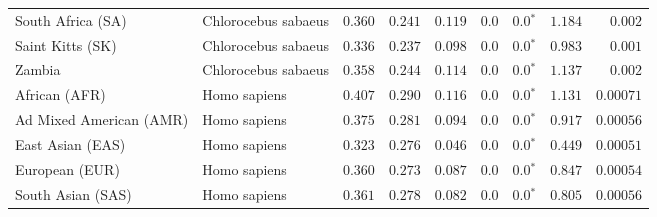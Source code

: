 \begin{center}
\begin{adjustbox}{width = 1\textwidth}
\begin{tabular}{|l|l|r|r|r|r|r|r|r|}
              South Africa (SA) &  Chlorocebus sabaeus &                                        $ 0.360$ &                                           $ 0.241$ &                      $ 0.119$ &            $0.0$ &                  $\bm{0.0{^*}}$ &                                           $ 1.184$ &           $ 0.002$ \\
               Saint Kitts (SK) &  Chlorocebus sabaeus &                                        $ 0.336$ &                                           $ 0.237$ &                      $ 0.098$ &            $0.0$ &                  $\bm{0.0{^*}}$ &                                           $ 0.983$ &           $ 0.001$ \\
                         Zambia &  Chlorocebus sabaeus &                                        $ 0.358$ &                                           $ 0.244$ &                      $ 0.114$ &            $0.0$ &                  $\bm{0.0{^*}}$ &                                           $ 1.137$ &           $ 0.002$ \\
                  African (AFR) &         Homo sapiens &                                        $ 0.407$ &                                           $ 0.290$ &                      $ 0.116$ &            $0.0$ &                  $\bm{0.0{^*}}$ &                                           $ 1.131$ &          $0.00071$ \\
        Ad Mixed American (AMR) &         Homo sapiens &                                        $ 0.375$ &                                           $ 0.281$ &                      $ 0.094$ &            $0.0$ &                  $\bm{0.0{^*}}$ &                                           $ 0.917$ &          $0.00056$ \\
               East Asian (EAS) &         Homo sapiens &                                        $ 0.323$ &                                           $ 0.276$ &                      $ 0.046$ &            $0.0$ &                  $\bm{0.0{^*}}$ &                                           $ 0.449$ &          $0.00051$ \\
                 European (EUR) &         Homo sapiens &                                        $ 0.360$ &                                           $ 0.273$ &                      $ 0.087$ &            $0.0$ &                  $\bm{0.0{^*}}$ &                                           $ 0.847$ &          $0.00054$ \\
              South Asian (SAS) &         Homo sapiens &                                        $ 0.361$ &                                           $ 0.278$ &                      $ 0.082$ &            $0.0$ &                  $\bm{0.0{^*}}$ &                                           $ 0.805$ &          $0.00056$ \\

\end{tabular}
\end{adjustbox}
\end{center}

